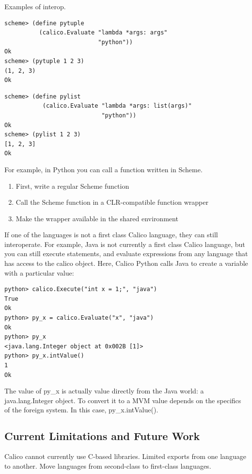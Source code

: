 \documentclass[preprint]{sigplanconf}
\begin{document}
Examples of interop.

\begin{verbatim}
scheme> (define pytuple 
          (calico.Evaluate "lambda *args: args" 
                           "python"))
Ok
scheme> (pytuple 1 2 3)
(1, 2, 3)
Ok
\end{verbatim}


\begin{verbatim}
scheme> (define pylist 
           (calico.Evaluate "lambda *args: list(args)" 
                            "python"))
Ok
scheme> (pylist 1 2 3)
[1, 2, 3]
Ok
\end{verbatim}

For example, in Python you can call a function written in Scheme.

\begin{enumerate}
\item First, write a regular Scheme function
\item Call the Scheme function in a CLR-compatible function wrapper
\item Make the wrapper available in the shared environment
\end{enumerate}

If one of the languages is not a first class Calico language, they can
still interoperate. For example, Java is not currently a first class
Calico language, but you can still execute statements, and evaluate
expressions from any language that has access to the calico
object. Here, Calico Python calls Java to create a variable with a
particular value:

\begin{verbatim}
python> calico.Execute("int x = 1;", "java")
True
Ok
python> py_x = calico.Evaluate("x", "java")
Ok
python> py_x
<java.lang.Integer object at 0x002B [1]>
python> py_x.intValue()
1
Ok
\end{verbatim}

The value of py\_x is actually value directly from the Java world: a
java.lang.Integer object. To convert it to a MVM value depends on the
specifics of the foreign system. In this case, py\_x.intValue().

\subsection{Current Limitations and Future Work}

Calico cannot currently use C-based libraries.
Limited exports from one language to another.
Move languages from second-class to first-class languages.
\end{document}

